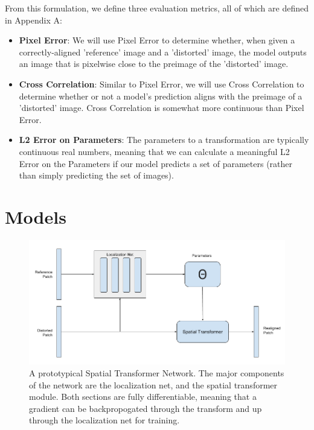 From this formulation, we define three evaluation metrics, all of which are defined in Appendix A:
\begin{itemize}
	\item \textbf{Pixel Error}: We will use Pixel Error to determine whether, when given a correctly-aligned 'reference' image and a 'distorted' image, the model outputs an image that is pixelwise close to the preimage of the 'distorted' image.
	\item \textbf{Cross Correlation}: Similar to Pixel Error, we will use Cross Correlation to determine whether or not a model's prediction aligns with the preimage of a 'distorted' image. Cross Correlation is somewhat more continuous than Pixel Error.
	\item \textbf{L2 Error on Parameters}: The parameters to a transformation are typically continuous real numbers, meaning that we can calculate a meaningful L2 Error on the Parameters if our model predicts a set of parameters (rather than simply predicting the set of images).
\end{itemize}

\section{Models}

\begin{figure}
\centering
\includegraphics[width=\textwidth]{img/Spatial_Transformer.png}
\caption[A prototypical Spatial Transformer Network]{A prototypical Spatial Transformer Network. The major components of the network are the localization net, and the spatial transformer module. Both sections are fully differentiable, meaning that a gradient can be backpropogated through the transform and up through the localization net for training.}
\label{fig:spatial_transformer}
\end{figure}


